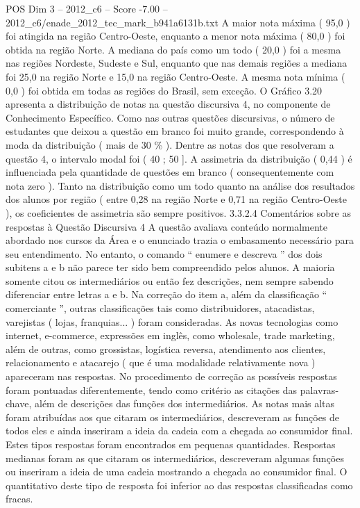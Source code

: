 \begin{textsample}{POS Dim 3 – 2012\_c6 – Score -7.00 – 2012\_c6/enade\_2012\_tec\_mark\_b941a6131b.txt}
A maior nota máxima ( 95,0 ) foi atingida na região Centro-Oeste, enquanto a menor nota máxima ( 80,0 ) foi obtida na região Norte.
A mediana do país como um todo ( 20,0 ) foi a mesma nas regiões Nordeste, Sudeste e Sul, enquanto que nas demais regiões a mediana foi 25,0 na região Norte e 15,0 na região Centro-Oeste.
A mesma nota mínima ( 0,0 ) foi obtida em todas as regiões do Brasil, sem exceção.
O Gráfico 3.20 apresenta a distribuição de notas na questão discursiva 4, no componente de Conhecimento Específico.
Como nas outras questões discursivas, o número de estudantes que deixou a questão em branco foi muito grande, correspondendo à moda da distribuição ( mais de 30 \% ).
Dentre as notas dos que resolveram a questão 4, o intervalo modal foi ( 40 ; 50 ].
A assimetria da distribuição ( 0,44 ) é influenciada pela quantidade de questões em branco ( consequentemente com nota zero ).
Tanto na distribuição como um todo quanto na análise dos resultados dos alunos por região ( entre 0,28 na região Norte e 0,71 na região Centro-Oeste ), os coeficientes de assimetria são sempre positivos. 3.3.2.4 Comentários sobre as respostas à Questão Discursiva 4 A questão avaliava conteúdo normalmente abordado nos cursos da Área e o enunciado trazia o embasamento necessário para seu entendimento.
No entanto, o comando “ enumere e descreva ” dos dois subitens a e b não parece ter sido bem compreendido pelos alunos.
A maioria somente citou os intermediários ou então fez descrições, nem sempre sabendo diferenciar entre letras a e b.
Na correção do item a, além da classificação “ comerciante ”, outras classificações tais como distribuidores, atacadistas, varejistas ( lojas, franquias... ) foram consideradas.
As novas tecnologias como internet, e-commerce, expressões em inglês, como wholesale, trade marketing, além de outras, como grossistas, logística reversa, atendimento aos clientes, relacionamento e atacarejo ( que é uma modalidade relativamente nova ) apareceram nas respostas.
No procedimento de correção as possíveis respostas foram pontuadas diferentemente, tendo como critério as citações das palavras-chave, além de descrições das funções dos intermediários.
As notas mais altas foram atribuídas aos que citaram os intermediários, descreveram as funções de todos eles e ainda inseriram a ideia da cadeia com a chegada ao consumidor final.
Estes tipos respostas foram encontrados em pequenas quantidades.
Respostas medianas foram as que citaram os intermediários, descreveram algumas funções ou inseriram a ideia de uma cadeia mostrando a chegada ao consumidor final.
O quantitativo deste tipo de resposta foi inferior ao das respostas classificadas como fracas.

\end{textsample}

